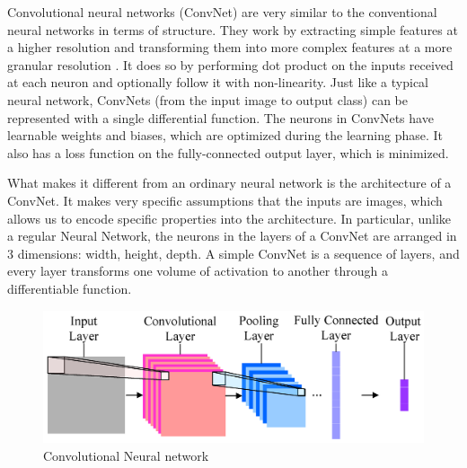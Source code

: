 Convolutional neural networks (ConvNet) are very similar to the conventional neural networks in terms of structure.  They work by extracting simple features at a higher resolution and transforming them into more complex features at a more granular resolution \cite{simard2003best}. It does so by performing dot product on the inputs received at each neuron and optionally follow it with non-linearity. Just like a typical neural network, ConvNets (from the input image to output class) can be represented with a single differential function. The neurons in ConvNets have learnable weights and biases, which are optimized during the learning phase.  It also has a loss function on the fully-connected output layer, which is minimized.

What makes it different from an ordinary neural network is the architecture of a ConvNet. It makes very specific assumptions that the inputs are images, which allows us to encode specific properties into the architecture. In particular, unlike a regular Neural Network, the neurons in the layers of a ConvNet are arranged in 3 dimensions: width, height, depth. A simple ConvNet is a sequence of layers, and every layer transforms one volume of activation to another through a differentiable function.

\begin{figure}[htb!]
    \centering
    \includegraphics[scale=1.25]{chapters/litReview/files/convNet.png}
    \caption{Convolutional Neural network \cite{convNN}}
    \label{Convolutional Neural network}
    \end{figure}
    \FloatBarrier
    

